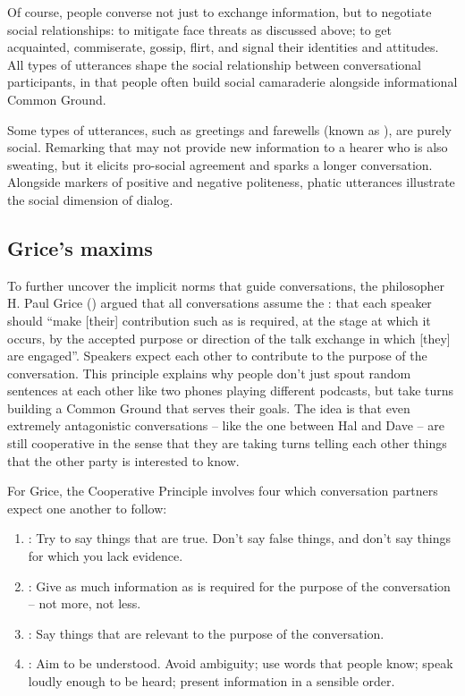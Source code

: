 Of course, people converse not just to exchange information, but to negotiate social relationships: to mitigate face threats as discussed above; to get acquainted,  commiserate, gossip, flirt, and  signal their identities and attitudes.   All types of utterances shape the social relationship between conversational participants, in that people often build social camaraderie alongside informational Common Ground.

Some types of utterances, such as greetings and farewells (known as ), are purely social.   Remarking that  may not provide new information to a hearer who is also sweating, but it elicits pro-social agreement and sparks a longer conversation.   Alongside markers of positive and negative politeness, phatic utterances illustrate the social dimension of dialog.  


\subsection{Grice's maxims}

To further uncover the implicit norms that guide conversations, the philosopher H. Paul Grice (\citeyear{grice:89}) argued that all conversations assume the : that each speaker should ``make [their] contribution such as is required, at the stage at which it occurs, by the accepted purpose or direction of the talk exchange in which [they] are engaged''.  Speakers expect each other to contribute to the purpose of the conversation.  This principle explains why people don't just spout random sentences at each other like two phones playing different podcasts, but take turns building a Common Ground that serves their goals.  The idea is that even extremely antagonistic conversations -- like the one between Hal and Dave -- are still cooperative in the sense that they are taking turns telling each other things that the other party is interested to know.

For Grice, the Cooperative Principle involves four  which conversation partners expect one another to follow:

\begin{enumerate}
    \item {}: Try to say things that are true. Don't say false things, and don't say things for which you lack evidence.
    \item {}: Give as much information as is required for the purpose of the conversation -- not more, not less.
    \item {}: Say things that are relevant to the purpose of the conversation. 
    \item {}: Aim to be understood. Avoid ambiguity; use words that people know; speak loudly enough to be heard; present information in a sensible order.
\end{enumerate}



